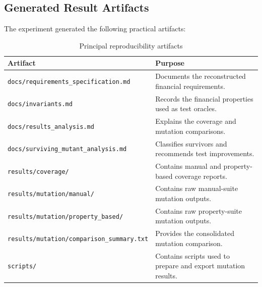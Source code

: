\documentclass[12pt]{article}
\begin{document}
\subsection{Generated Result Artifacts}

The experiment generated the following practical artifacts:

\begin{table}[H]
\centering
\caption{Principal reproducibility artifacts}
\label{tab:reproducibility-artifacts}

\scriptsize
\setlength{\tabcolsep}{3pt}
\renewcommand{\arraystretch}{1.15}

\begin{tabular}{|p{4.6cm}|p{8.0cm}|}
\hline
\textbf{Artifact} & \textbf{Purpose} \\
\hline

\raggedright\texttt{docs/requirements\_\allowbreak specification.md} &
Documents the reconstructed financial requirements. \\
\hline

\raggedright\texttt{docs/invariants.md} &
Records the financial properties used as test oracles. \\
\hline

\raggedright\texttt{docs/results\_\allowbreak analysis.md} &
Explains the coverage and mutation comparisons. \\
\hline

\raggedright\texttt{docs/surviving\_\allowbreak mutant\_\allowbreak analysis.md} &
Classifies survivors and recommends test improvements. \\
\hline

\raggedright\texttt{results/coverage/} &
Contains manual and property-based coverage reports. \\
\hline

\raggedright\texttt{results/mutation/\allowbreak manual/} &
Contains raw manual-suite mutation outputs. \\
\hline

\raggedright\texttt{results/mutation/\allowbreak property\_based/} &
Contains raw property-suite mutation outputs. \\
\hline

\raggedright\texttt{results/mutation/\allowbreak comparison\_summary.txt} &
Provides the consolidated mutation comparison. \\
\hline

\raggedright\texttt{scripts/} &
Contains scripts used to prepare and export mutation results. \\
\hline

\end{tabular}

\renewcommand{\arraystretch}{1}
\setlength{\tabcolsep}{6pt}
\end{table}
\end{document}
